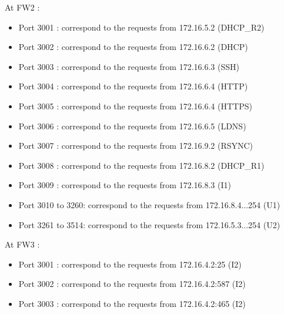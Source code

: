 \documentclass[a4paper,titlepage]{article}
\begin{document}
At FW2 :
\begin{itemize}
	\item Port 3001 : correspond to the requests from 172.16.5.2 (DHCP\_R2)
	\item Port 3002 : correspond to the requests from 172.16.6.2 (DHCP)
	\item Port 3003 : correspond to the requests from 172.16.6.3 (SSH)
	\item Port 3004 : correspond to the requests from 172.16.6.4 (HTTP)
	\item Port 3005 : correspond to the requests from 172.16.6.4 (HTTPS)
	\item Port 3006 : correspond to the requests from 172.16.6.5 (LDNS)
	\item Port 3007 : correspond to the requests from 172.16.9.2 (RSYNC)
	\item Port 3008 : correspond to the requests from 172.16.8.2 (DHCP\_R1)
	\item Port 3009 : correspond to the requests from 172.16.8.3 (I1)
	\item Port 3010 to 3260: correspond to the requests from 172.16.8.4...254 (U1)
	\item Port 3261 to 3514: correspond to the requests from 172.16.5.3...254 (U2)

\end{itemize}

At FW3 :
\begin{itemize}
	\item Port 3001 : correspond to the requests from 172.16.4.2:25 (I2)
	\item Port 3002 : correspond to the requests from 172.16.4.2:587 (I2)
	\item Port 3003 : correspond to the requests from 172.16.4.2:465 (I2)
\end{itemize}
\end{document}
